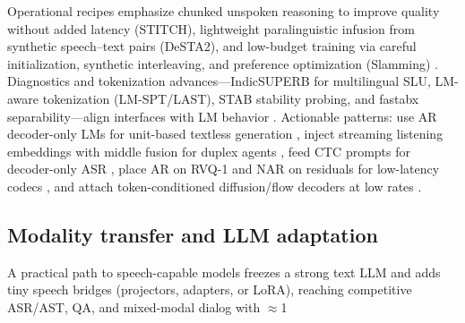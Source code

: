 \documentclass{article}
\begin{document}
Operational recipes emphasize chunked unspoken reasoning to improve quality without added latency (STITCH), lightweight paralinguistic infusion from synthetic speech--text pairs (DeSTA2), and low-budget training via careful initialization, synthetic interleaving, and preference optimization (Slamming) \cite{chiang2025stitchsimultaneousthinkingtalkingchunked,lu2025desta2developinginstructionfollowingspee,maimon2025slammingtrainingspeechlanguagemodelonegp}. Diagnostics and tokenization advances---IndicSUPERB for multilingual SLU, LM-aware tokenization (LM-SPT/LAST), STAB stability probing, and fastabx separability---align interfaces with LM behavior \cite{entry2025indicsuperbspeechprocessinguniversalperf,jo2025lmsptalignedsemanticdistillationspeechto,turetzky2024lastlanguagemodelawarespeechtokenization,vashishth2024stabspeechtokenizerassessmentbenchmark,poli2025fastabxlibraryefficientcomputationabxdis}. Actionable patterns: use AR decoder-only LMs for unit-based textless generation \cite{nakata2024jchatjapaneselargescalespokendialoguecor}, inject streaming listening embeddings with middle fusion for duplex agents \cite{ma2024languagemodelcanlistenwhilespeaking}, feed CTC prompts for decoder-only ASR \cite{tsunoo2024decoderonlyarchitecturespeechrecognition}, place AR on RVQ-1 and NAR on residuals for low-latency codecs \cite{min2025speechretrievalaugmentedgenerationwithou,li2024investigatingneuralaudiocodecsspeechlang}, and attach token-conditioned diffusion/flow decoders at low rates \cite{yang2025diffsoundstreamefficientspeechtokenizati,jo2025lmsptalignedsemanticdistillationspeechto,vashishth2024stabspeechtokenizerassessmentbenchmark}.

\subsection{Modality transfer and LLM adaptation} \label{subsec:Modality transfer and LLM adaptation}
A practical path to speech-capable models freezes a strong text LLM and adds tiny speech bridges (projectors, adapters, or LoRA), reaching competitive ASR/AST, QA, and mixed-modal dialog with $\approx$1%
\end{document}
